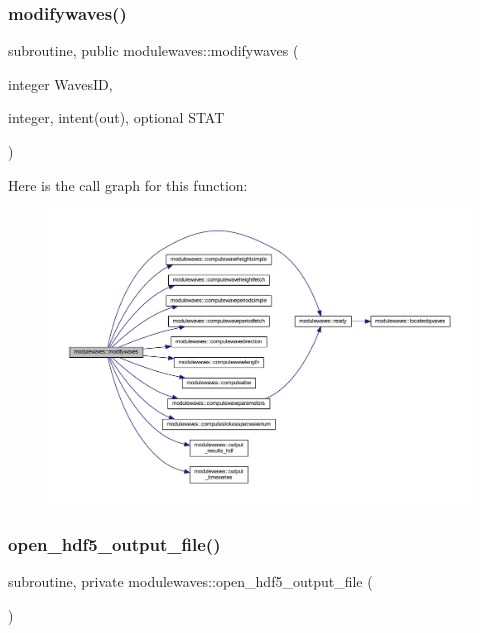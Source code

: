 \subsubsection{\texorpdfstring{modifywaves()}{modifywaves()}}
{\footnotesize\ttfamily subroutine, public modulewaves\+::modifywaves (\begin{DoxyParamCaption}\item[{integer}]{Waves\+ID,  }\item[{integer, intent(out), optional}]{S\+T\+AT }\end{DoxyParamCaption})}

Here is the call graph for this function\+:\nopagebreak
\begin{figure}[H]
\begin{center}
\leavevmode
\includegraphics[width=350pt]{namespacemodulewaves_ad08ecc5e93cabd5c4b166e1af608e044_cgraph}
\end{center}
\end{figure}
\mbox{\label{namespacemodulewaves_ad471c985c50cab76ec8f36df2211dc37}} 
\subsubsection{\texorpdfstring{open\+\_\+hdf5\+\_\+output\+\_\+file()}{open\_hdf5\_output\_file()}}
{\footnotesize\ttfamily subroutine, private modulewaves\+::open\+\_\+hdf5\+\_\+output\+\_\+file (\begin{DoxyParamCaption}{ }\end{DoxyParamCaption})\hspace{0.3cm}{\ttfamily [private]}}

